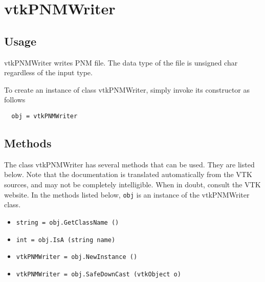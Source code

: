 \section{vtkPNMWriter}

\subsection{Usage}

 vtkPNMWriter writes PNM file. The data type
 of the file is unsigned char regardless of the input type.

To create an instance of class vtkPNMWriter, simply
invoke its constructor as follows
\begin{verbatim}
  obj = vtkPNMWriter
\end{verbatim}
\subsection{Methods}

The class vtkPNMWriter has several methods that can be used.
  They are listed below.
Note that the documentation is translated automatically from the VTK sources,
and may not be completely intelligible.  When in doubt, consult the VTK website.
In the methods listed below, \verb|obj| is an instance of the vtkPNMWriter class.
\begin{itemize}
\item  \verb|string = obj.GetClassName ()|

\item  \verb|int = obj.IsA (string name)|

\item  \verb|vtkPNMWriter = obj.NewInstance ()|

\item  \verb|vtkPNMWriter = obj.SafeDownCast (vtkObject o)|

\end{itemize}
